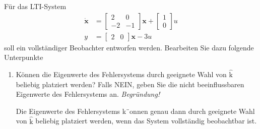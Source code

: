 \documentclass[crop=false]{standalone}
\begin{document}
\begin{task}
Für das LTI-System
\[\begin{aligned} \dot{\mathbf{x}} &=\left[\begin{array}{cc}{2} & {0} \\ {-2} & {-1}\end{array}\right] \mathbf{x}+\left[\begin{array}{c}{1} \\ {0}\end{array}\right] u \\ y &=\left[\begin{array}{cc}{2} & {0}\end{array}\right] \mathbf{x}-3 u \end{aligned}\]
soll ein vollständiger Beobachter entworfen werden. Bearbeiten Sie dazu folgende Unterpunkte
\begin{enumerate}[i]
    \item Können die Eigenwerte des Fehlersystems durch geeignete Wahl von $\hat{\mathrm{k}}$ beliebig
platziert werden? Falls NEIN, geben Sie die nicht beeinflussbaren Eigenwerte des
Fehlersystems an. \emph{Begründung!}
\begin{solution}
Die Eigenwerte des Fehlersystems k¨onnen genau dann durch geeignete Wahl von $\hat{\mathrm{k}}$ beliebig platziert werden, wenn das System vollständig beobachtbar ist.


\end{solution}
\end{enumerate}
\end{task}
\end{document}
